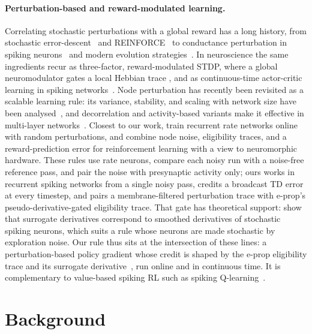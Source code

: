 \documentclass[10pt,twocolumn]{article}
\begin{document}
\paragraph{Perturbation-based and reward-modulated learning.}
Correlating stochastic perturbations with a global reward has a long history,
from stochastic error-descent~\citep{Cauwenberghs1992} and
REINFORCE~\citep{Williams1992REINFORCE} to conductance perturbation in spiking
neurons~\citep{fiete2006gradient} and modern evolution
strategies~\citep{salimans2017evolutionstrategiesscalablealternative}. In
neuroscience the same ingredients recur as three-factor, reward-modulated STDP,
where a global neuromodulator gates a local Hebbian trace
\citep{Fremaux2016NeuromodulatedSTDP,Izhikevich2007DistalReward,Florian2007RewardSTDP,Legenstein2008RewardSTDP},
and as continuous-time actor-critic learning in spiking
networks~\citep{Frmaux2013ReinforcementLU}. Node perturbation has recently
been revisited as a scalable learning rule: its variance, stability, and
scaling with network size have been analysed~\citep{Hiratani2022NodePerturbation},
and decorrelation and activity-based variants make it effective in multi-layer
networks~\citep{Dalm2026NodePerturbation}. Closest to our work,
\citet{GarciaFernandez2024RNNPerturbation} train recurrent rate networks online
with random perturbations, and \citet{GarciaFernandez2026NoiseReward} combine
node noise, eligibility traces, and a reward-prediction error for reinforcement
learning with a view to neuromorphic hardware. These rules use rate neurons,
compare each noisy run with a noise-free reference pass, and pair the noise
with presynaptic activity only; ours works in recurrent spiking networks from a
single noisy pass, credits a broadcast TD error at every timestep, and pairs a
membrane-filtered perturbation trace with e-prop's pseudo-derivative-gated
eligibility trace. That gate has theoretical support:
\citet{Gygax2025SurrogateTheory} show that surrogate derivatives correspond to
smoothed derivatives of stochastic spiking neurons, which suits a rule whose
neurons are made stochastic by exploration noise. Our rule thus sits at the
intersection of these lines: a perturbation-based policy gradient whose
credit is shaped by the e-prop eligibility trace and its surrogate
derivative~\citep{Neftci2019Surrogate}, run online and in continuous time. It
is complementary to value-based spiking RL such as spiking
Q-learning~\citep{Chen2022SpikingQLearning}.

\section{Background}
\label{sec:background}
\end{document}
